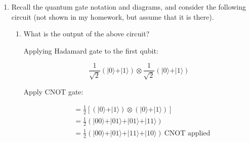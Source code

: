 \documentclass[10pt]{article}
\newcommand{\ket}[1]{\vert #1 \rangle}
\begin{document}
\begin{enumerate}
\begin{enumerate}
        \item{Is $\ket{\psi}$ a separable state or entangled state?}

          $\ket{\psi}$ is separable if it can be written as $(a\ket{0} + b\ket{1}) \otimes (c\ket{0} + d\ket{1})$ for some $a,b,c,d$.

          For $\ket{\psi} = \frac12 \ket{00} + \frac12 \ket{01} - \frac{i}{\sqrt2} \ket{11}$, the coefficients are as follows:

          \begin{equation*}
            ac = \frac12, \ ad = \frac12, \ bc = 0, \ bd = -\frac{i}{\sqrt2}
          \end{equation*}

          With case $b = 0$, the equation $bd = -\frac{i}{\sqrt2} \ne 0$.

          With case $c = 0$, $ac = \frac12 \ne 0$.

          This state does not follow $(a\ket{0} + b\ket{1}) \otimes (c\ket{0} + d\ket{1})$, and therefore this state is entangled and cannot be separated.

      \end{enumerate}

    \item{Recall the quantum gate notation and diagrams, and consider the following circuit (not shown in my homework, but assume that it is there).}

      \begin{enumerate}
        \item{What is the output of the above circuit?}

          Applying Hadamard gate to the first qubit:

          \begin{equation*}
            \frac{1}{\sqrt2} (\ket{0} + \ket{1}) \otimes \frac{1}{\sqrt2} (\ket{0} + \ket{1})
          \end{equation*}

          Apply CNOT gate:

          \begin{align*}
            &= \frac{1}{2}[(\ket{0} + \ket{1}) \otimes (\ket{0} + \ket{1})] \\
            &= \frac{1}{2} (\ket{00} + \ket{01} + \ket{01} + \ket{11}) \\
            &= \frac{1}{2} (\ket{00} + \ket{01} + \ket{11} + \ket{10}) \ \text{CNOT applied}
          \end{align*}


\end{enumerate}
\end{enumerate}
\end{document}
